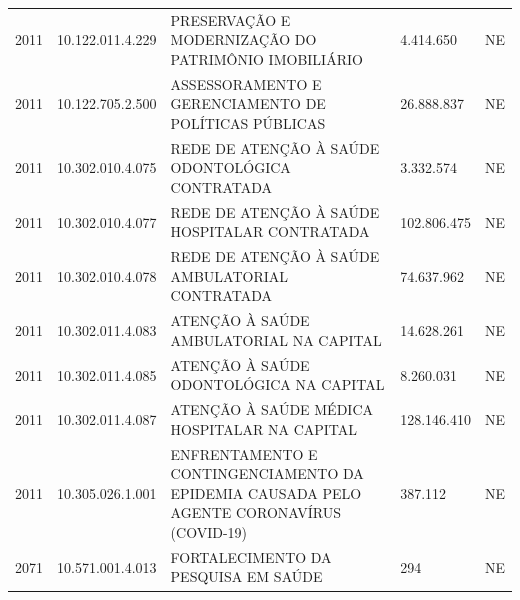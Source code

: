 \documentclass{article}
\begin{document}
\begin{longtable}[c]{m{1cm}|m{2cm}|m{10cm}|m{2cm}|m{1cm}}
\multicolumn{1}{C{1cm}|}{2011} & \multicolumn{1}{C{2cm}|}{10.122.011.4.229} & \multicolumn{1}{L{10cm}|}{PRESERVAÇÃO E MODERNIZAÇÃO DO PATRIMÔNIO IMOBILIÁRIO} & \multicolumn{1}{R{2cm}|}{4.414.650} & \multicolumn{1}{C{1cm}}{NE} \\
\multicolumn{1}{C{1cm}|}{2011} & \multicolumn{1}{C{2cm}|}{10.122.705.2.500} & \multicolumn{1}{L{10cm}|}{ASSESSORAMENTO E GERENCIAMENTO DE POLÍTICAS PÚBLICAS} & \multicolumn{1}{R{2cm}|}{26.888.837} & \multicolumn{1}{C{1cm}}{NE} \\
\multicolumn{1}{C{1cm}|}{2011} & \multicolumn{1}{C{2cm}|}{10.302.010.4.075} & \multicolumn{1}{L{10cm}|}{REDE DE ATENÇÃO À SAÚDE ODONTOLÓGICA CONTRATADA} & \multicolumn{1}{R{2cm}|}{3.332.574} & \multicolumn{1}{C{1cm}}{NE} \\
\multicolumn{1}{C{1cm}|}{2011} & \multicolumn{1}{C{2cm}|}{10.302.010.4.077} & \multicolumn{1}{L{10cm}|}{REDE DE ATENÇÃO À SAÚDE HOSPITALAR CONTRATADA} & \multicolumn{1}{R{2cm}|}{102.806.475} & \multicolumn{1}{C{1cm}}{NE} \\
\multicolumn{1}{C{1cm}|}{2011} & \multicolumn{1}{C{2cm}|}{10.302.010.4.078} & \multicolumn{1}{L{10cm}|}{REDE DE ATENÇÃO À SAÚDE AMBULATORIAL CONTRATADA} & \multicolumn{1}{R{2cm}|}{74.637.962} & \multicolumn{1}{C{1cm}}{NE} \\
\multicolumn{1}{C{1cm}|}{2011} & \multicolumn{1}{C{2cm}|}{10.302.011.4.083} & \multicolumn{1}{L{10cm}|}{ATENÇÃO À SAÚDE AMBULATORIAL NA CAPITAL} & \multicolumn{1}{R{2cm}|}{14.628.261} & \multicolumn{1}{C{1cm}}{NE} \\
\multicolumn{1}{C{1cm}|}{2011} & \multicolumn{1}{C{2cm}|}{10.302.011.4.085} & \multicolumn{1}{L{10cm}|}{ATENÇÃO À SAÚDE ODONTOLÓGICA NA CAPITAL} & \multicolumn{1}{R{2cm}|}{8.260.031} & \multicolumn{1}{C{1cm}}{NE} \\
\multicolumn{1}{C{1cm}|}{2011} & \multicolumn{1}{C{2cm}|}{10.302.011.4.087} & \multicolumn{1}{L{10cm}|}{ATENÇÃO À SAÚDE MÉDICA HOSPITALAR NA CAPITAL} & \multicolumn{1}{R{2cm}|}{128.146.410} & \multicolumn{1}{C{1cm}}{NE} \\
\multicolumn{1}{C{1cm}|}{2011} & \multicolumn{1}{C{2cm}|}{10.305.026.1.001} & \multicolumn{1}{L{10cm}|}{ENFRENTAMENTO E CONTINGENCIAMENTO DA EPIDEMIA CAUSADA PELO AGENTE CORONAVÍRUS (COVID-19)} & \multicolumn{1}{R{2cm}|}{387.112} & \multicolumn{1}{C{1cm}}{NE} \\
\multicolumn{1}{C{1cm}|}{2071} & \multicolumn{1}{C{2cm}|}{10.571.001.4.013} & \multicolumn{1}{L{10cm}|}{FORTALECIMENTO DA PESQUISA EM SAÚDE} & \multicolumn{1}{R{2cm}|}{294} & \multicolumn{1}{C{1cm}}{NE} \\

\end{longtable}
\end{document}
